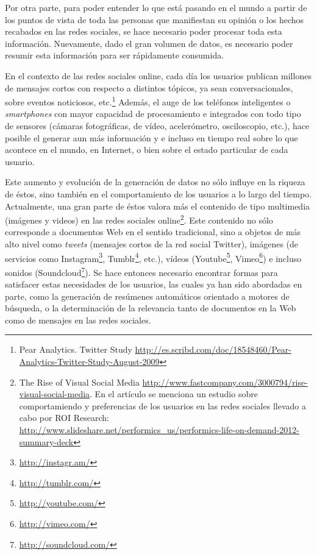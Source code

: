 \documentclass[upright, contnum]{umemoria}
\begin{document}
   Por otra parte, para poder entender lo que está pasando en el
   mundo a partir de los puntos de vista de toda las personas que
   manifiestan su opinión o los hechos recabados en las redes
   sociales, se hace necesario poder procesar toda esta
   información. Nuevamente, dado el gran volumen de datos, es
   necesario poder resumir esta información para ser rápidamente
   consumida. 

   En el contexto de las redes sociales online, cada día los usuarios
   publican  millones de mensajes cortos con respecto a distintos
   tópicos, ya sean conversacionales, sobre eventos noticiosos, 
   etc.\footnote{Pear Analytics. Twitter Study \href{http://es.scribd.com/doc/18548460/Pear-Analytics-Twitter-Study-August-2009}{http://es.scribd.com/doc/18548460/Pear-Analytics-Twitter-Study-August-2009} }
   Además, el auge de los teléfonos inteligentes o \emph{smartphones} con mayor
   capacidad de procesamiento e integrados con todo tipo de sensores
   (cámaras fotográficas, de vídeo, acelerómetro, osciloscopio, etc.),
   hace posible el generar aun más información y
   e incluso en tiempo real sobre lo que acontece en el mundo, en
   Internet, o bien sobre el estado particular de cada usuario.

   Este aumento y evolución de la generación de datos no sólo influye en la
   riqueza de éstos, sino también en el comportamiento de los usuarios
   a lo largo del tiempo. Actualmente,  una gran parte de éstos valora
   más el contenido de tipo multimedia (imágenes y videos)
   en las redes sociales online\footnote{The Rise of Visual Social Media \href{http://www.fastcompany.com/3000794/rise-visual-social-media}{http://www.fastcompany.com/3000794/rise-visual-social-media}. En el artículo se menciona un estudio sobre comportamiendo y preferencias de los usuarios en las redes sociales llevado a cabo por ROI Research: \href{http://www.slideshare.net/performics_us/performics-life-on-demand-2012-summary-deck}{http://www.slideshare.net/performics\_us/performics-life-on-demand-2012-summary-deck} }. 
   Este contenido no sólo corresponde a documentos Web en el sentido
   tradicional, sino a objetos de más alto nivel como \emph{tweets}
   (mensajes cortos de la red social Twitter), imágenes (de servicios
   como Instagram\footnote{\href{http://instagr.am/}{http://instagr.am/} },
   Tumblr\footnote{\href{http://tumblr.com/}{http://tumblr.com/} }, etc.), vídeos
   (Youtube\footnote{\href{http://youtube.com/}{http://youtube.com/} }, Vimeo\footnote{\href{http://vimeo.com/}{http://vimeo.com/} }) e
   incluso sonidos (Soundcloud\footnote{\href{http://soundcloud.com/}{http://soundcloud.com/} }).
   Se hace entonces necesario encontrar formas para satisfacer estas
   necesidades de los usuarios, las cuales ya han sido
   abordadas en parte, como la generación de
   resúmenes automáticos orientado a motores de búsqueda, o la
   determinación de la relevancia tanto de documentos en la Web como de
   mensajes en las redes sociales.
\end{document}
